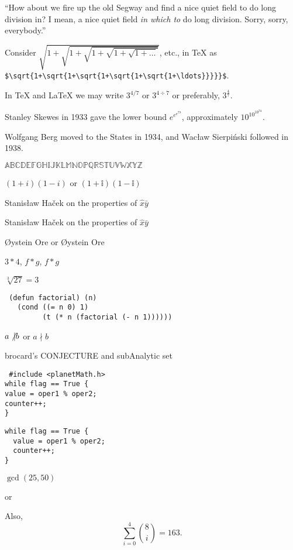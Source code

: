 \documentclass[12pt]{article}
\begin{document}
``How about we fire up the old Segway and find a nice quiet field to do long division in? I mean, a nice quiet field {\em in which to} do long division. Sorry, sorry, everybody.''\\

Consider $\sqrt{1+\sqrt{1+\sqrt{1+\sqrt{1+\sqrt{1+\ldots}}}}}$, etc., in \TeX{} as \verb'$\sqrt{1+\sqrt{1+\sqrt{1+\sqrt{1+\sqrt{1+\ldots}}}}}$'.

In \TeX{} and \LaTeX{} we may write $3^{4/7}$ or $3^{4 \div 7}$ or preferably, $3^{\frac{4}{7}}$.

Stanley Skewes in 1933 gave the lower bound $e^{e^{e^{79}}}$, approximately $10^{{10}^{{10}^{34}}}$.

Wolfgang Berg moved to the States in 1934, and Wac\l{}aw Sierpi\'nski followed in 1938.

$\mathbb{A} \mathbb{B} \mathbb{C} \mathbb{D} \mathbb{E} \mathbb{F} \mathbb{G} \mathbb{H} \mathbb{I} \mathbb{J} \mathbb{K} \mathbb{L} \mathbb{M} \mathbb{N} \mathbb{O} \mathbb{P} \mathbb{Q} \mathbb{R} \mathbb{S} \mathbb{T} \mathbb{U} \mathbb{V} \mathbb{W} \mathbb{X} \mathbb{Y} \mathbb{Z}$

$(1 + i)(1 - i)$ or $(1 + \mathbb{i})(1 - \mathbb{i})$

Stanis\l{}aw Ha\v{c}ek on the properties of $\hat{x}\bar{y}$

Stanis{\l}aw Ha\v{c}ek on the properties of $\hat{x}\bar{y}$

{\O}ystein Ore or \O{}ystein Ore

$3 * 4$, $f * g$, $f \ast g$

$\sqrt[3]{27} = 3$


\begin{flushleft}
\texttt{
(defun factorial) (n) \\
\ \ \ (cond ((= n 0) 1) \\
\ \ \ \ \ \ \ \ \ (t (* n (factorial (- n 1))))))}
\end{flushleft}

$a \not\vert b$ or $a\nmid b$

brocard's CONJECTURE and subAnalytic set

\begin{flushleft}
\texttt{
\#include <planetMath.h> \\
while flag == True \{ \\
\quad value = oper1 \% oper2; \\
\quad counter++; \\
\}}
\end{flushleft}

\begin{verbatim}
while flag == True {
  value = oper1 % oper2;
  counter++;
}
\end{verbatim}

$\gcd(25,50)$

 or 


Also, $$\sum_{i = 0}^4 {8 \choose i} = 163.$$
\end{document}
